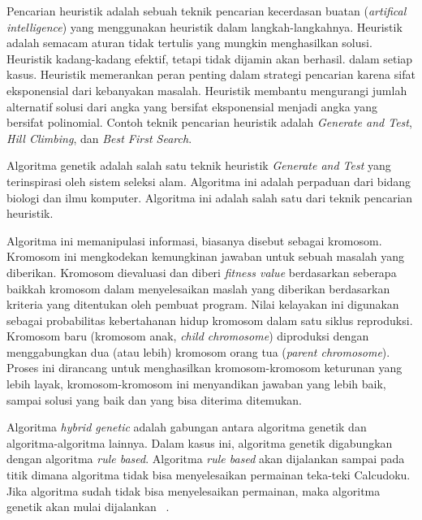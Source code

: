 Pencarian heuristik adalah sebuah teknik pencarian kecerdasan buatan (\textit{artifical intelligence}) yang menggunakan heuristik dalam langkah-langkahnya. Heuristik adalah semacam aturan tidak tertulis yang mungkin menghasilkan solusi. Heuristik kadang-kadang efektif, tetapi tidak dijamin akan berhasil. dalam setiap kasus. Heuristik memerankan peran penting dalam strategi pencarian karena sifat eksponensial dari kebanyakan masalah. Heuristik membantu mengurangi jumlah alternatif solusi dari angka yang bersifat eksponensial menjadi angka yang bersifat polinomial. Contoh teknik pencarian heuristik adalah \textit{Generate and Test}, \textit{Hill Climbing}, dan \textit{Best First Search}.

Algoritma genetik adalah salah satu teknik heuristik \textit{Generate and Test} yang terinspirasi oleh sistem seleksi alam. Algoritma ini adalah perpaduan dari bidang biologi dan ilmu komputer. Algoritma ini adalah salah satu dari teknik pencarian heuristik.

Algoritma ini memanipulasi informasi, biasanya disebut sebagai kromosom. Kromosom ini mengkodekan kemungkinan jawaban untuk sebuah masalah yang diberikan. Kromosom dievaluasi dan diberi \textit{fitness value} berdasarkan seberapa baikkah kromosom dalam menyelesaikan maslah yang diberikan berdasarkan kriteria yang ditentukan oleh pembuat program. Nilai kelayakan ini digunakan sebagai probabilitas kebertahanan hidup kromosom dalam satu siklus reproduksi. Kromosom baru (kromosom anak, \textit{child chromosome}) diproduksi dengan menggabungkan dua (atau lebih) kromosom orang tua (\textit{parent chromosome}). Proses ini dirancang untuk menghasilkan kromosom-kromosom keturunan yang lebih layak, kromosom-kromosom ini menyandikan jawaban yang lebih baik, sampai solusi yang baik dan yang bisa diterima ditemukan.

Algoritma \textit{hybrid genetic} adalah gabungan antara algoritma genetik dan algoritma-algoritma lainnya. Dalam kasus ini, algoritma genetik digabungkan dengan algoritma \textit{rule based}. Algoritma \textit{rule based} akan dijalankan sampai pada titik dimana algoritma tidak bisa menyelesaikan permainan teka-teki Calcudoku. Jika algoritma sudah tidak bisa menyelesaikan permainan, maka algoritma genetik akan mulai dijalankan ~\cite{johanna:12:hybrid}.

